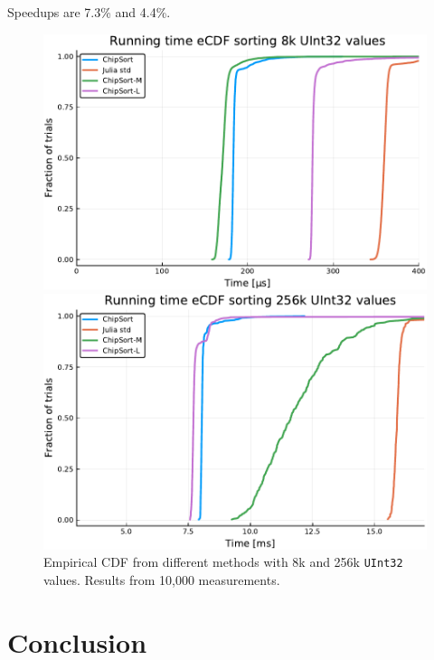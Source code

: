 \documentclass{juliacon}
\begin{document}
 Speedups are 7.3\% and 4.4\%.

\begin{figure}[htb]
\centerline{\includegraphics[width=0.99\linewidth]{fig/chipsort-bench-8k.pdf}}
\centerline{\includegraphics[width=0.99\linewidth]{fig/chipsort-bench-256k.pdf}}
\caption{Empirical CDF from different methods with 8k and 256k {\tt UInt32} values. Results from 10,000 measurements.}
\label{fig:bench-cdf}
\end{figure}




\section{Conclusion}
\label{sec:conclusion}
%



\end{document}
